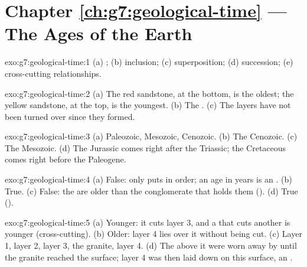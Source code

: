 \section*{Chapter \ref{ch:g7:geological-time} --- The Ages of the Earth}

\begin{solution}{exo:g7:geological-time:1}
(a) ; (b) inclusion; (c) superposition; (d) 
succession; (e) cross-cutting relationships.
\end{solution}

\begin{solution}{exo:g7:geological-time:2}
(a) The red sandstone, at the bottom, is the oldest; the yellow
sandstone, at the top, is the youngest. (b) The . (c) The layers have not been turned over since they
formed.
\end{solution}

\begin{solution}{exo:g7:geological-time:3}
(a) Paleozoic, Mesozoic, Cenozoic. (b) The Cenozoic. (c) The Mesozoic.
(d) The Jurassic comes right after the Triassic; the Cretaceous comes
right before the Paleogene.
\end{solution}

\begin{solution}{exo:g7:geological-time:4}
(a) False:  only puts  in order; an age in years is
an . (b) True. (c) False: the  are older than the
conglomerate that holds them (). (d) True
().
\end{solution}

\begin{solution}{exo:g7:geological-time:5}
(a) Younger: it cuts layer 3, and a  that cuts another is younger
(cross-cutting). (b) Older: layer 4 lies over it without being cut.
(c) Layer 1, layer 2, layer 3, the granite, layer 4. (d) The  above
it were worn away by  until the granite reached the surface;
layer 4 was then laid down on this  surface, an .
\end{solution}

